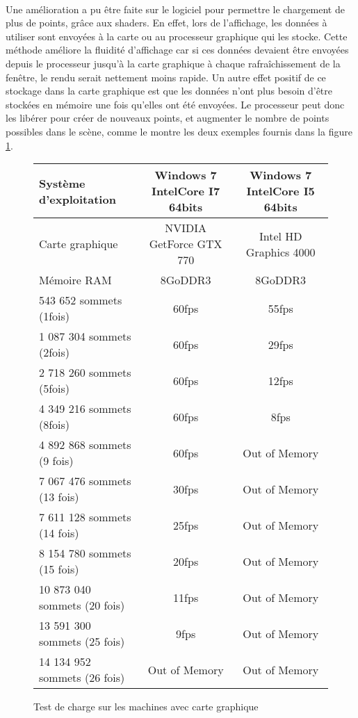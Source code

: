 \paragraph{}
Une amélioration a pu être faite sur le logiciel pour permettre le chargement de plus de points, grâce aux shaders. En effet, lors de l'affichage, les données à utiliser sont envoyées à la carte ou au processeur graphique qui les stocke. Cette méthode améliore la fluidité d'affichage car si ces données devaient être envoyées depuis le processeur jusqu'à la carte graphique à chaque rafraîchissement de la fenêtre, le rendu serait nettement moins rapide. Un autre effet positif de ce stockage dans la carte graphique est que les données n'ont plus besoin d'être stockées en mémoire une fois qu'elles ont été envoyées. Le processeur peut donc les libérer pour créer de nouveaux points, et augmenter le nombre de points possibles dans le scène, comme le montre les deux exemples fournis dans la figure \ref{tab:charge_v2}.

\begin{figure}[h]
  \begin{changemargin}{-4cm}{-4cm}
    \centering
    \begin{tabular}{|l|c|c|}
      \hline
      Système d'exploitation & Windows 7 IntelCore I7 64bits & Windows 7 IntelCore I5 64bits\\ \hline
      Carte graphique &  NVIDIA GetForce GTX 770 & Intel HD Graphics 4000\\ \hline
      Mémoire RAM & 8GoDDR3 & 8GoDDR3 \\ \hline \hline
      543 652 sommets (1fois) & 60fps & 55fps \\ \hline
      1 087 304 sommets (2fois) & 60fps & 29fps \\ \hline
      2 718 260 sommets (5fois) & 60fps & 12fps \\ \hline
      4 349 216 sommets (8fois) & 60fps & 8fps  \\ \hline
      4 892 868 sommets (9 fois) & 60fps  & Out of Memory \\ \hline
      7 067 476 sommets (13 fois) & 30fps & Out of Memory \\ \hline
      7 611 128 sommets (14 fois) & 25fps & Out of Memory \\ \hline
      8 154 780 sommets (15 fois) & 20fps & Out of Memory \\ \hline
      10 873 040 sommets (20 fois) & 11fps & Out of Memory \\ \hline
      13 591 300 sommets (25 fois) & 9fps & Out of Memory \\ \hline
      14 134 952 sommets (26 fois) & Out of Memory & Out of Memory \\ \hline
    \end{tabular}
  \end{changemargin}
  \caption{Test de charge sur les machines avec carte graphique}
  \label{tab:charge_v2}
\end{figure}

